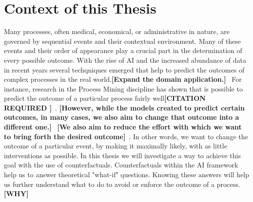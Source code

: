\documentclass[12pt,a4paper,footinclude=true,headinclude=true]{report}
\newcommand{\attention}[1]{\color{red}\textbf{[#1]}\color{black}~}
\newcommand{\needscite}[1]{\color{red}\textbf{[CITATION REQUIRED #1]}\color{black}~}
\begin{document}
\section{Context of this Thesis}
Many processes, often medical, economical, or administrative in nature, are governed by sequential events and their contextual environment. Many of these events and their order of appearance play a crucial part in the determination of every possible outcome. With the rise of AI and the increased abundance of data in recent years several techqniques emerged that help to predict the outcomes of complex processes in the real world.\attention{Expand the domain application.}
For instance, research in the Process Mining discipline has shown that is possible to predict the outcome of a particular process fairly well\needscite{}. \attention{However, while the models created to predict certain outcomes, in many cases, we also aim to change that outcome into a different one.}  \attention{We also aim to reduce the effort with which we want to bring forth the desired outcome}. In other words, we want to change the outcome of a particular event, by making it maximally likely, with as little interventions as possible. In this thesis we will investigate a way to achieve this goal with the use of counterfactuals. Counterfactuals within the AI framework help us to answer theoretical "what-if" questions. Knowing these answers will help us further understand what to do to avoid or enforce the outcome of a process.\attention{WHY}
\end{document}
